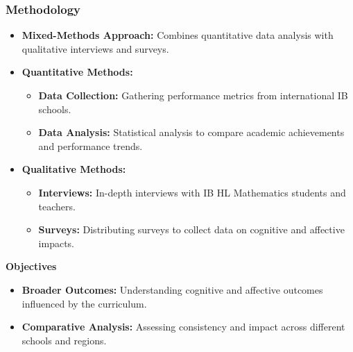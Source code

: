 \documentclass{beamer}
\begin{document}
\begin{frame}
  \frametitle{Methodology}
  \begin{itemize}
      \item \textbf{Mixed-Methods Approach:} Combines quantitative data analysis with qualitative interviews and surveys.
      \item \textbf{Quantitative Methods:}
      \begin{itemize}
          \item \textbf{Data Collection:} Gathering performance metrics from international IB schools.
          \item \textbf{Data Analysis:} Statistical analysis to compare academic achievements and performance trends.
      \end{itemize}
      \item \textbf{Qualitative Methods:}
      \begin{itemize}
          \item \textbf{Interviews:} In-depth interviews with IB HL Mathematics students and teachers.
          \item \textbf{Surveys:} Distributing surveys to collect data on cognitive and affective impacts.
      \end{itemize}
  \end{itemize}
  \vspace{0.3cm}
  \textbf{Objectives}
  \begin{itemize}
      \item \textbf{Broader Outcomes:} Understanding cognitive and affective outcomes influenced by the curriculum.
      \item \textbf{Comparative Analysis:} Assessing consistency and impact across different schools and regions.
  \end{itemize}
  \vspace{0.3cm}
  
\end{frame}
\end{document}
